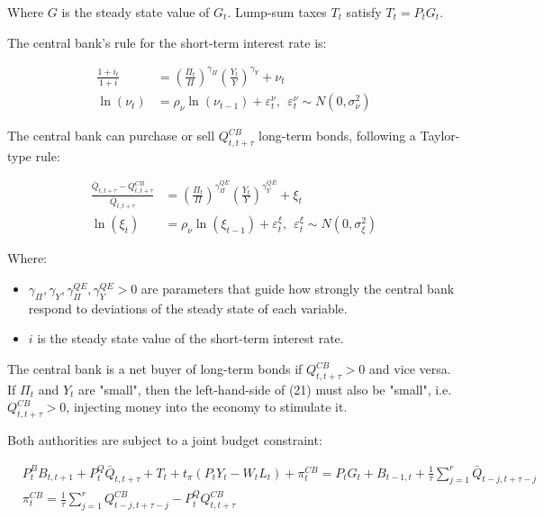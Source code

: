 \documentclass[12pt]{article}
\begin{document}
Where $G$ is the steady state value of $G_t$. Lump-sum taxes $T_t$ satisfy $T_t = P_tG_t$.

The central bank's rule for the short-term interest rate is:

\begin{align*}
    \frac{1 + i_t}{1 + i} &= \left(\frac{\Pi_t}{\Pi}\right)^{\gamma_\Pi}\left(\frac{Y_t}{Y}\right)^{\gamma_Y} + \nu_t \tag{19}\\
    \ln(\nu_t) &= \rho_\nu \ln(\nu_{t-1}) + \varepsilon_t^\nu, ~~ \varepsilon_t^\nu \sim N(0, \sigma^2_\nu) \tag{20}
\end{align*}

The central bank can purchase or sell $Q^{CB}_{t, t+\tau}$ long-term bonds, following a Taylor-type rule:

\begin{align*}
    \frac{\bar Q_{t, t+\tau} - Q^{CB}_{t, t+\tau}}{\bar Q_{t, t+\tau}} &= \left(\frac{\Pi_t}{\Pi}\right)^{\gamma^{QE}_\Pi}\left(\frac{Y_t}{Y}\right)^{\gamma^{QE}_Y} + \xi_t \tag{21}\\
    \ln(\xi_t) &= \rho_\nu \ln(\xi_{t-1}) + \varepsilon_t^\xi, ~~ \varepsilon_t^\xi \sim N(0, \sigma^2_\xi) \tag{22}
\end{align*}

Where:

\begin{itemize}
    \item $\gamma_\Pi, \gamma_Y, \gamma^{QE}_\Pi, \gamma^{QE}_Y > 0$ are parameters that guide how strongly the central bank respond to deviations of the steady state of each variable.
    \item $i$ is the steady state value of the short-term interest rate.
\end{itemize}

The central bank is a net buyer of long-term bonds if $Q^{CB}_{t, t+\tau} > 0$ and vice versa. If $\Pi_t$ and $Y_t$ are "small", then the left-hand-side of (21) must also be "small", i.e. $Q^{CB}_{t, t+\tau} > 0$, injecting money into the economy to stimulate it.

Both authorities are subject to a joint budget constraint:

\begin{align*}
    &P_{t}^{B}B_{t,t+1}+P_{t}^{Q}\bar{Q}_{t,t+\tau}+T_{t}+t_{\pi}(P_{t}Y_{t}-W_{t}L_{t})+\pi_{t}^{C B}=P_{t}G_{t}+B_{t-1,t}+{\frac{1}{\tau}}\sum_{j=1}^{r}\bar{Q}_{t-j,t+\tau-j}\\
    &\pi^{CB}_t = {\frac{1}{\tau}}\sum_{j=1}^{r}Q^{CB}_{t-j,t+\tau-j} - P^Q_tQ^{CB}_{t,t+\tau}
\end{align*}
\end{document}
